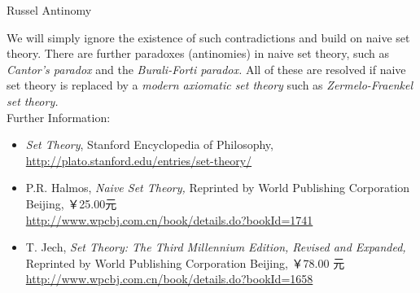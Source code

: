 \documentclass[smaller,hyperref={CJKbookmarks=true}]{beamer}
\begin{document}
\begin{frame}[t,label=Russel Antinomy]{Russel Antinomy}
\begin{spacing}{1.1}
We will simply ignore the existence of such contradictions and build on
naive set theory. There are further paradoxes (antinomies) in naive set
theory, such as \emph{Cantor's paradox} and the \emph{Burali-Forti paradox.} All of these
are resolved if naive set theory is replaced by a \emph{modern axiomatic set
theory} such as \emph{Zermelo-Fraenkel set theory.}\\[6pt]
\alert{Further Information:}
\begin{itemize}
  \item \emph{Set Theory}, Stanford Encyclopedia of Philosophy, \url{http://plato.stanford.edu/entries/set-theory/}
  \item P.R. Halmos, \emph{Naive Set Theory,} Reprinted by World Publishing Corporation Beijing, ￥25.00元\\
      \url{http://www.wpcbj.com.cn/book/details.do?bookId=1741}
  \item T. Jech, \emph{Set Theory: The Third Millennium Edition, Revised and Expanded,} Reprinted by World Publishing Corporation Beijing, ￥78.00 元\\
      \url{http://www.wpcbj.com.cn/book/details.do?bookId=1658}
\end{itemize}
\end{spacing}
\end{frame}
\end{document}
